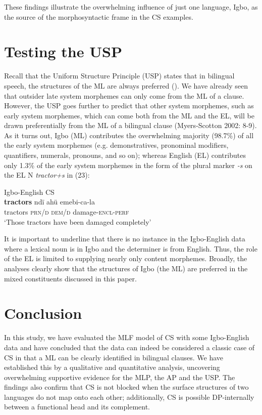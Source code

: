 \documentclass[output=paper]{langsci/langscibook}
\begin{document}
 

These findings illustrate the overwhelming influence of just one language, Igbo, as the source of the morphosyntactic frame in the CS examples. 

\section{Testing the USP}

Recall that the Uniform Structure Principle (USP) states that in bilingual speech, the structures of the ML are always preferred (). We have already seen that outsider late system morphemes can only come from the ML of a clause. However, the USP goes further to predict that other system morphemes, such as early system morphemes, which can come both from the ML and the EL, will be drawn preferentially from the ML of a bilingual clause (Myers-Scotton 2002: 8-9). As it turns out, Igbo (ML) contributes the overwhelming majority (98.7\%) of all the early system morphemes (e.g. demonstratives, pronominal modifiers, quantifiers, numerals, pronouns, and so on); whereas English (EL) contributes only 1.3\% of the early system morphemes in the form of the plural marker \textit{{}-s} on the EL N \textit{tractor+s }in (23): 

\ea
{Igbo-English CS}\\
\gll \textbf{tractors  }ndï    ahü  emebi-ca-la\\
     tractors  \textsc{prn/d}\textsubscript{    }\textsc{dem/d}  damage-\textsc{encl-perf}\textsubscript{ }\\
\glt ‘Those tractors have been damaged completely’
\z

It is important to underline that there is no instance in the Igbo-English data where a lexical noun is in Igbo and the determiner is from English. Thus, the role of the EL is limited to supplying nearly only content morphemes. Broadly, the analyses clearly show that the structures of Igbo (the ML) are preferred in the mixed constituents discussed in this paper.

\section{Conclusion}

In this study, we have evaluated the MLF model of CS with some Igbo-English data and have concluded that the data can indeed be considered a classic case of CS in that a ML can be clearly identified in bilingual clauses. We have established this by a qualitative and quantitative analysis, uncovering overwhelming supportive evidence for the MLP, the AP and the USP. The findings also confirm that CS is not blocked when the surface structures of two languages do not map onto each other; additionally, CS is possible DP-internally between a functional head and its complement. 
\end{document}
